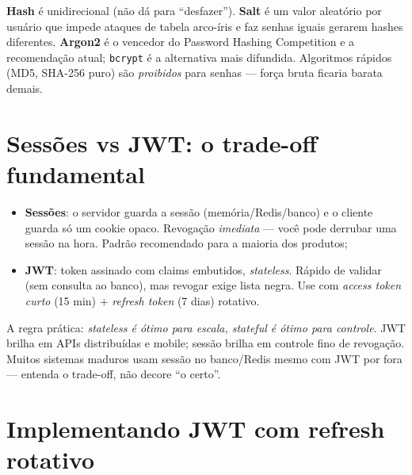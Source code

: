 \begin{caixaconceito}
\textbf{Hash} é unidirecional (não dá para ``desfazer''). \textbf{Salt} é um
valor aleatório por usuário que impede ataques de tabela arco-íris e faz
senhas iguais gerarem hashes diferentes. \textbf{Argon2} é o vencedor do
Password Hashing Competition e a recomendação atual; \texttt{bcrypt} é a
alternativa mais difundida. Algoritmos rápidos (MD5, SHA-256 puro) são
\emph{proibidos} para senhas — força bruta ficaria barata demais.
\end{caixaconceito}

\section{Sessões vs JWT: o trade-off fundamental}

\begin{itemize}[leftmargin=*, itemsep=0.4em]
  \item \textbf{Sessões}: o servidor guarda a sessão (memória/Redis/banco) e o
  cliente guarda só um cookie opaco. Revogação \emph{imediata} — você pode
  derrubar uma sessão na hora. Padrão recomendado para a maioria dos produtos;
  \item \textbf{JWT}: token assinado com claims embutidos, \emph{stateless}.
  Rápido de validar (sem consulta ao banco), mas revogar exige lista negra.
  Use com \emph{access token curto} (15 min) + \emph{refresh token} (7 dias) rotativo.
\end{itemize}

\begin{caixaconceito}
A regra prática: \emph{stateless é ótimo para escala, stateful é ótimo para
controle}. JWT brilha em APIs distribuídas e mobile; sessão brilha em controle
fino de revogação. Muitos sistemas maduros usam sessão no banco/Redis mesmo
com JWT por fora — entenda o trade-off, não decore ``o certo''.
\end{caixaconceito}

\section{Implementando JWT com refresh rotativo}

